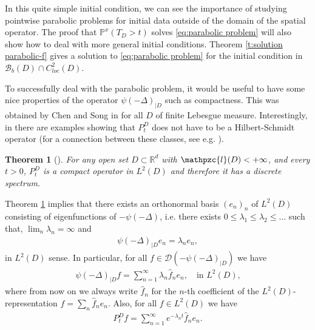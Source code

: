 \documentclass[reqno]{amsart}
\newtheorem{theorem}{Theorem}[section] %
\theoremstyle{remark}
\numberwithin{equation}{section} %
\newcommand{\Lpsi}{\psi(-\Delta)}
\newcommand{\LpsiD}{\Lpsi_{|D}}
\newcommand{\BB}{\mathcal{B}}
\newcommand{\DD}{\mathcal{D}}
\newcommand{\wh}{\widehat}
\newcommand{\1}{\mathds{1}}
\begin{document}
	In this quite simple initial condition, we can see the importance of studying pointwise parabolic problems for initial data outside of the domain of the spatial operator. The proof that $\mathds{P}^x(T_D>t)$ solves \eqref{eq:parabolic problem} will also show how to deal with more general initial conditions. Theorem \ref{t:solution parabolic-f} gives a solution to \eqref{eq:parabolic problem} for the initial condition in $\BB_b(D)\cap C_{loc}^2(D)$.
	
	To successfully deal with the parabolic problem, it would be useful to have some nice properties of the operator $\LpsiD$ such as compactness. This was obtained by Chen and Song in \cite{ChenSong-spectralSBM-07} for all $D$ of finite Lebesgue measure. Interestingly, in \cite[Section 3]{ChenSong-spectralSBM-07} there are examples showing that $ P_t^D$ does not have to be a Hilbert-Schmidt operator (for a connection between these classes, see e.g. \cite[Chapter 5]{apple-semigr}).
	\begin{theorem}[{\cite[Theorem 2.1]{ChenSong-spectralSBM-07}}]\label{t:spectrum}
		For any open set $D\subset \mathbb{R}^d$ with $\mathpzc{l}(D)<+\infty$, and every $t > 0$, $ P^D_t$ is a compact operator in $L^2(D)$ and therefore it has a discrete spectrum.
	\end{theorem}
	Theorem \ref{t:spectrum} implies that there exists an orthonormal basis $(e_n)_n$ of $L^2(D)$ consisting of eigenfunctions of $-\Lpsi$, i.e. there exists $0\le \lambda_1\le\lambda_2\le \dots$ such that, $\lim_n\lambda_n=\infty$ and 
	\begin{align*}
		\LpsiD e_n=\lambda_n e_n,
	\end{align*}
	in $L^2(D)$ sense. In particular, for all $f\in \DD(-\LpsiD)$ we have
	\begin{align}\label{eq:LpsiD series}
		\LpsiD f=\sum_{n=1}^\infty \lambda_n \wh f_n e_n, \quad \text{in $L^2(D)$,}
	\end{align}
	where from now on we always write $\wh f_n$ for the $n$-th coefficient of the $L^2(D)$-representation $f=\sum_n \wh f_n e_n$. Also, for all $f\in L^2(D)$ we have
	\begin{align}\label{eq:SKBM group series}
		P^D_t f=\sum_{n=1}^\infty e^{-\lambda_nt} \wh f_n e_n.
	\end{align}
	
\end{document}
